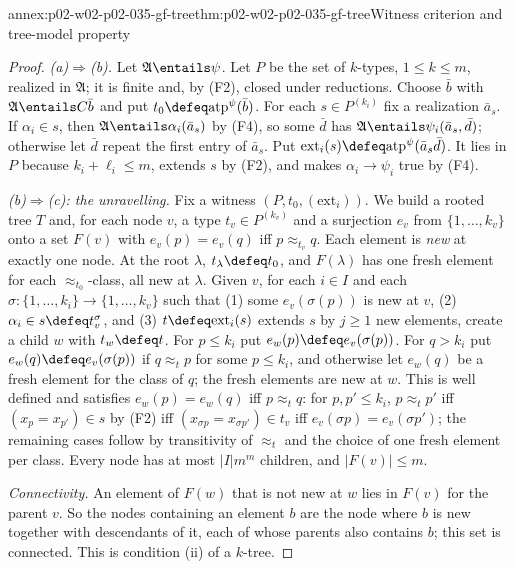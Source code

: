 \begin{annexitem}{annex:p02-w02-p02-035-gf-tree}{thm:p02-w02-p02-035-gf-tree}{Witness criterion and tree-model property}
\begin{proof}
\emph{(a)\(\Rightarrow\)(b).}  Let \(\mathfrak A\entails\psi\).  Let \(P\) be
the set of \(k\)-types, \(1\leq k\leq m\), realized in \(\mathfrak A\); it
is finite and, by (F2), closed under reductions.  Choose \(\bar b\) with
\(\mathfrak A\entails C\bar b\) and put
\(t_0\defeq\mathrm{atp}^{\psi}(\bar b)\).  For each \(s\in P^{(k_i)}\) fix a
realization \(\bar a_s\).  If \(\alpha_i\in s\), then
\(\mathfrak A\entails\alpha_i(\bar a_s)\) by (F4), so some \(\bar d\) has
\(\mathfrak A\entails\psi_i(\bar a_s,\bar d)\); otherwise let \(\bar d\) repeat
the first entry of \(\bar a_s\).  Put
\(\mathrm{ext}_i(s)\defeq\mathrm{atp}^{\psi}(\bar a_s\bar d)\).  It lies in
\(P\) because \(k_i+\ell_i\leq m\), extends \(s\) by (F2), and makes
\(\alpha_i\to\psi_i\) true by (F4).

\emph{(b)\(\Rightarrow\)(c): the unravelling.}  Fix a witness
\((P,t_0,(\mathrm{ext}_i))\).  We build a rooted tree \(T\) and, for each node
\(v\), a type \(t_v\in P^{(k_v)}\) and a surjection \(e_v\) from
\(\{1,\ldots,k_v\}\) onto a set \(F(v)\) with
\(e_v(p)=e_v(q)\) iff \(p\approx_{t_v}q\).  Each element is \emph{new} at
exactly one node.  At the root \(\lambda\), \(t_\lambda\defeq t_0\), and
\(F(\lambda)\) has one fresh element for each \(\approx_{t_0}\)-class, all new
at \(\lambda\).  Given \(v\), for each \(i\in I\) and each
\(\sigma:\{1,\ldots,k_i\}\to\{1,\ldots,k_v\}\) such that (1) some
\(e_v(\sigma(p))\) is new at \(v\), (2) \(\alpha_i\in s\defeq t_v^\sigma\),
and (3) \(t\defeq\mathrm{ext}_i(s)\) extends \(s\) by \(j\geq1\) new
elements, create a child \(w\) with \(t_w\defeq t\).  For \(p\leq k_i\) put
\(e_w(p)\defeq e_v(\sigma(p))\).  For \(q>k_i\) put \(e_w(q)\defeq e_v(\sigma(p))\)
if \(q\approx_t p\) for some \(p\leq k_i\), and otherwise let \(e_w(q)\) be a
fresh element for the class of \(q\); the fresh elements are new at \(w\).
This is well defined and satisfies \(e_w(p)=e_w(q)\) iff \(p\approx_t q\):
for \(p,p'\leq k_i\), \(p\approx_t p'\) iff \((x_p=x_{p'})\in s\) by (F2)
iff \((x_{\sigma p}=x_{\sigma p'})\in t_v\) iff
\(e_v(\sigma p)=e_v(\sigma p')\); the remaining cases follow by transitivity
of \(\approx_t\) and the choice of one fresh element per class.  Every node
has at most \(\lvert I\rvert m^m\) children, and \(\lvert F(v)\rvert\leq m\).

\emph{Connectivity.}  An element of \(F(w)\) that is not new at \(w\) lies in
\(F(v)\) for the parent \(v\).  So the nodes containing an element \(b\) are
the node where \(b\) is new together with descendants of it, each of whose
parents also contains \(b\); this set is connected.  This is condition (ii)
of a \(k\)-tree.


\end{proof}
\end{annexitem}
